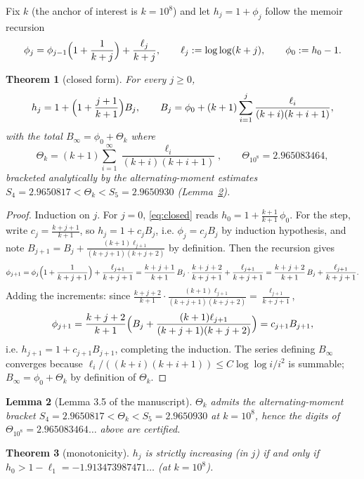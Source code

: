 \documentclass[11pt]{article}
\newtheorem{theorem}{Theorem}[section]
\newtheorem{lemma}[theorem]{Lemma}
\theoremstyle{remark}
\begin{document}
Fix $k$ (the anchor of interest is $k=10^8$) and let
$h_j=1+\phi_j$ follow the memoir recursion
\[
\phi_j=\phi_{j-1}\Bigl(1+\frac1{k+j}\Bigr)+\frac{\ell_j}{k+j},
\qquad \ell_j:=\log\log(k+j),\qquad \phi_0:=h_0-1 .
\]

\begin{theorem}[closed form]\label{thm:closed}
For every $j\ge0$,
\begin{equation}\label{eq:closed}
h_j=1+\Bigl(1+\frac{j+1}{k+1}\Bigr)B_j,\qquad
B_j=\phi_0+(k+1)\sum_{i=1}^{j}\frac{\ell_i}{(k+i)(k+i+1)},
\end{equation}
with the \emph{total} $B_\infty=\phi_0+\Theta_k$ where
\[
\Theta_k=(k+1)\sum_{i=1}^{\infty}\frac{\ell_i}{(k+i)(k+i+1)} ,
\qquad \Theta_{10^8}=2.965083464 ,
\]
bracketed analytically by the alternating-moment estimates
$S_4=2.9650817<\Theta_k<S_5=2.9650930$ (Lemma~\ref{lem:Theta}).
\end{theorem}

\begin{proof}
Induction on $j$. For $j=0$, \eqref{eq:closed} reads
$h_0=1+\frac{k+1}{k+1}\,\phi_0$. For the step, write
$c_j=\frac{k+j+1}{k+1}$, so $h_j=1+c_jB_j$, i.e.
$\phi_j=c_jB_j$ by induction hypothesis, and note $B_{j+1}=B_j+\frac{(k+1)\ell_{j+1}}{(k+j+1)(k+j+2)}$
by definition. Then the recursion gives
\[
\phi_{j+1}
=\phi_j\Bigl(1+\frac{1}{k+j+1}\Bigr)+\frac{\ell_{j+1}}{k+j+1}
=\frac{k+j+1}{k+1}\,B_j\cdot\frac{k+j+2}{k+j+1}+\frac{\ell_{j+1}}{k+j+1}
=\frac{k+j+2}{k+1}\,B_j+\frac{\ell_{j+1}}{k+j+1}.
\]
Adding the increments: since
$\frac{k+j+2}{k+1}\cdot\frac{(k+1)\ell_{j+1}}{(k+j+1)(k+j+2)}=\frac{\ell_{j+1}}{k+j+1}$,
\[
\phi_{j+1}
=\frac{k+j+2}{k+1}\Bigl(B_j+\frac{(k+1)\ell_{j+1}}{(k+j+1)(k+j+2)}\Bigr)
=c_{j+1}B_{j+1},
\]
i.e. $h_{j+1}=1+c_{j+1}B_{j+1}$, completing the induction. The series defining
$B_\infty$ converges because $\ell_i/((k+i)(k+i+1))\le C\log\log i/i^2$ is
summable; $B_\infty=\phi_0+\Theta_k$ by definition of $\Theta_k$.
\end{proof}

\begin{lemma}[Lemma 3.5 of the manuscript]\label{lem:Theta}
$\Theta_k$ admits the alternating-moment bracket
$S_4=2.9650817<\Theta_k<S_5=2.9650930$ at $k=10^8$, hence the digits of
$\Theta_{10^8}=2.965083464\dots$ above are certified.
\end{lemma}

\begin{theorem}[monotonicity]\label{thm:mono}
$h_j$ is strictly increasing (in $j$) if and only if
$h_0>1-\ell_1=-1.913473987471\dots$ (at $k=10^8$).
\end{theorem}
\end{document}

